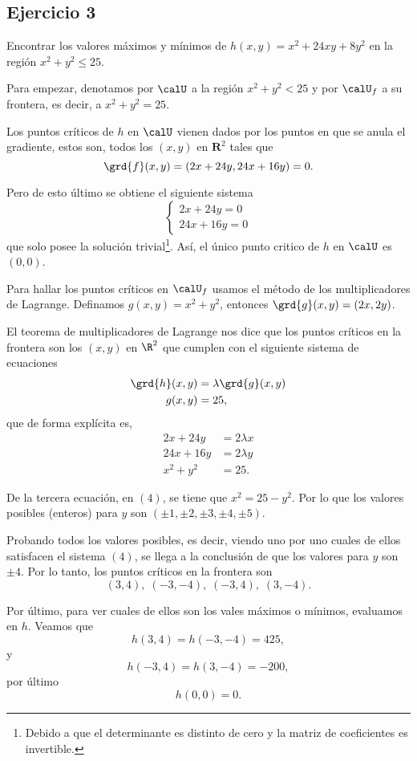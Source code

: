 \subsection*{Ejercicio 3}
	Encontrar los valores máximos y mínimos de $h(x,y)=x^2+24xy+8y^2$ en la región $x^2+y^2\leq 25$.
\begin{sol}
	Para empezar, denotamos por $\calU$ a la región $x^2+y^2<25$ y por $\calU_f$ a su frontera, es decir, a $x^2+y^2=25$.
	
	Los puntos críticos de $h$ en $\calU$ vienen dados por los puntos en que se anula el gradiente, estos son, todos los $(x,y)$ en $\mathbf{R}^2$ tales que
	\[ \grd{f}(x,y) = (2x+24y, 24x+16y) = 0. \] 
	
	Pero de esto último se obtiene el siguiente sistema
	\[ \begin{cases} 2x+24y = 0 \\ 24x+16y = 0 \end{cases} \] 
	que solo posee la solución trivial\footnote{Debido a que el determinante es distinto de cero y la matriz de coeficientes es invertible.}. Así, el único punto critico de $h$ en $\calU$ es $(0,0)$.
	
	Para hallar los puntos críticos en $\calU_f$ usamos el método de los multiplicadores de Lagrange. Definamos $g(x,y) = x^2+y^2$, entonces $\grd{g}(x,y) = (2x,2y)$.
	
	El teorema de multiplicadores de Lagrange nos dice que los puntos críticos en la frontera son los $(x,y)$ en $\R^2$ que cumplen con el siguiente sistema de ecuaciones
	\begin{align*}
	\grd{h}(x,y) &= \lambda \grd{g}(x,y) \\
	g(x,y) &= 25,		
	\end{align*} 
	que de forma explícita es,
	\begin{align*}
	2x+24y &= 2\lambda x \\
	24x + 16y &= 2\lambda y \tag{4} \\
	x^2+y^2 &= 25.
	\end{align*}
	
	De la tercera ecuación, en $(4)$, se tiene que $x^2 = 25 - y^2$. Por lo que los valores posibles (enteros) para $y$ son $(\pm1,\pm2,\pm3,\pm4,\pm5)$.
	
	Probando todos los valores posibles, es decir, viendo uno por uno cuales de ellos satisfacen el sistema $(4)$, se llega a la conclusión de que los valores para $y$ son $\pm4$. Por lo tanto, los puntos críticos en la frontera son
	\[ (3,4), \; (-3,-4), \; (-3,4), \; (3,-4). \]
	
	Por último, para ver cuales de ellos son los vales máximos o mínimos, evaluamos en $h$. Veamos que
	\[ h(3,4)=h(-3,-4)=425, \]
	y 
	\[ h(-3,4)=h(3,-4)=-200, \]
	por último
	\[ h(0,0)=0. \] 
\end{sol}

